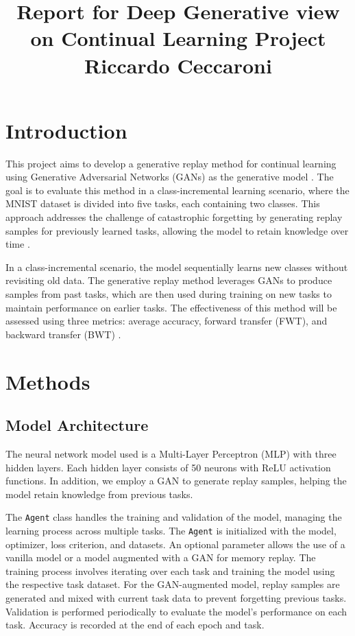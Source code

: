 \documentclass{article}
\title{Report for Deep Generative view on Continual Learning
Project\\[1cm]Riccardo Ceccaroni}
\begin{document}
\maketitle


\section{Introduction}
This project aims to develop a generative replay method for continual learning using Generative Adversarial Networks (GANs) as the generative model \cite{Goodfellow2014GAN}. The goal is to evaluate this method in a class-incremental learning scenario, where the MNIST dataset \cite{LeCun1998MNIST} is divided into five tasks, each containing two classes. This approach addresses the challenge of catastrophic forgetting by generating replay samples for previously learned tasks, allowing the model to retain knowledge over time \cite{Shin2017Continual, Wu2018MemoryReplay}.

In a class-incremental scenario, the model sequentially learns new classes without revisiting old data. The generative replay method leverages GANs to produce samples from past tasks, which are then used during training on new tasks to maintain performance on earlier tasks. The effectiveness of this method will be assessed using three metrics: average accuracy, forward transfer (FWT), and backward transfer (BWT) \cite{LopezPaz2017GEM, Chaudhry2018RWalk, DiazRodriguez2018DONUT}. 

\section{Methods}

\subsection{Model Architecture}
The neural network model used is a Multi-Layer Perceptron (MLP) with three hidden layers. Each hidden layer consists of 50 neurons with ReLU activation functions. In addition, we employ a GAN to generate replay samples, helping the model retain knowledge from previous tasks.

The \texttt{Agent} class handles the training and validation of the model, managing the learning process across multiple tasks.
The \texttt{Agent} is initialized with the model, optimizer, loss criterion, and datasets. An optional parameter allows the use of a vanilla model or a model augmented with a GAN for memory replay.
The training process involves iterating over each task and training the model using the respective task dataset. For the GAN-augmented model, replay samples are generated and mixed with current task data to prevent forgetting previous tasks.
Validation is performed periodically to evaluate the model's performance on each task. Accuracy is recorded at the end of each epoch and task.
\end{document}
